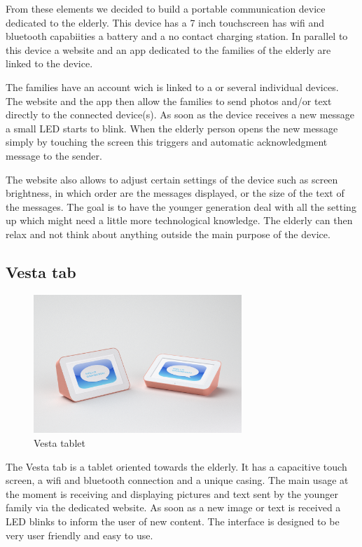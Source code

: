 From these elements we decided to build a portable communication device dedicated to the elderly. This device has a 7 inch touchscreen has wifi and bluetooth
capabiities a battery and a no contact charging station. In parallel to this device a website and an app dedicated to the families of the elderly are linked to the device.

The families have an account wich is linked to a or several individual devices. The website and the app then allow the families to send photos and/or text directly to the connected device(s).
As soon as the device receives a new message a small LED starts to blink. When the elderly person opens the new message simply by touching the screen this triggers and automatic acknowledgment message to the sender.

The website also allows to adjust certain settings of the device such as screen brightness, in which order are the messages displayed, or the size of the text of the messages. The goal is to have the younger generation deal with all the setting up which might need a little more technological knowledge. The elderly can then relax and not think about anything outside the main purpose of the device.

\clearpage

\subsection{Vesta tab}

\begin{figure}[!htb]
    \centering
    \includegraphics[width=0.7\textwidth,keepaspectratio]{chap/designFig/VisioRender5.png}
    \caption{Vesta tablet}
    \label{fig:vesta tablet}
\end{figure}

The Vesta tab is a tablet oriented towards the elderly. It has a capacitive touch screen, a wifi and bluetooth connection and a unique casing. The main usage at the moment is receiving and displaying pictures and text sent by the younger family via the dedicated website. As soon as a new image or text is received a LED blinks to inform the user of new content. The interface is designed to be very user friendly and easy to use.
